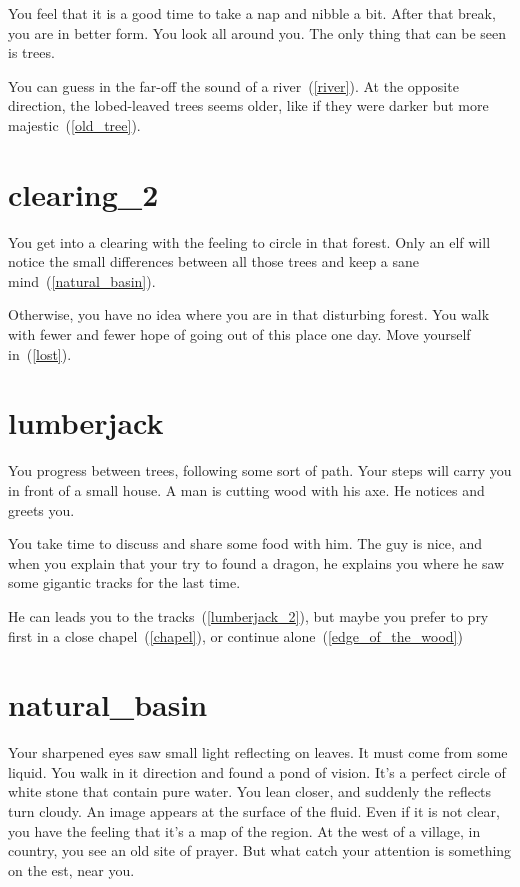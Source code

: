 You feel that it is a good time to take a nap and nibble a bit. After that
break, you are in better form. You look all around you. The only thing that can
be seen is trees.

You can guess in the far-off the sound of a river~(\ref{river}). At the opposite
direction, the lobed-leaved trees seems older, like if they were darker but more
majestic~(\ref{old_tree}).

\section{clearing_2}

You get into a clearing with the feeling to circle in that forest. Only an elf
will notice the small differences between all those trees and keep a sane
mind~(\ref{natural_basin}).

Otherwise, you have no idea where you are in that disturbing forest. You walk
with fewer and fewer hope of going out of this place one day. Move yourself
in~(\ref{lost}).

\section{lumberjack}

You progress between trees, following some sort of path. Your steps will carry
you in front of a small house. A man is cutting wood with his axe. He notices
and greets you.

You take time to discuss and share some food with him. The guy is nice, and when
you explain that your try to found a dragon, he explains you where he saw some
gigantic tracks for the last time.

He can leads you to the tracks~(\ref{lumberjack_2}), but maybe you prefer to pry
first in a close chapel~(\ref{chapel}), or continue alone~(\ref{edge_of_the_wood})

\section{natural_basin}

Your sharpened eyes saw small light reflecting on leaves. It must come from some
liquid. You walk in it direction and found a pond of vision. It's a perfect
circle of white stone that contain pure water. You lean closer, and suddenly the
reflects turn cloudy. An image appears at the surface of the fluid. Even if it
is not clear, you have the feeling that it's a map of the region. At the west of
a village, in country, you see an old site of prayer. But what catch your
attention is something on the est, near you.

